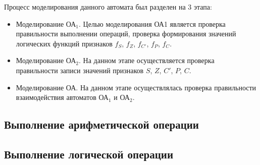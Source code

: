 Процесс моделирования данного автомата был разделен на 3 этапа:
\begin{itemize}
	\item Моделирование ОА$_1$. Целью моделирования ОА1 является проверка правильности выполнении операций, проверка формирования значений логических функций признаков $f_S$, $f_Z$, $f_{C'}$, $f_P$, $f_C$. 
	\item Моделирование ОА$_2$. На данном этапе осуществляется проверка правильности записи значений признаков $S$, $Z$, $C'$, $P$, $C$.
	\item Моделирование ОА. На данном этапе осуществлялась проверка правильности взаимодействия автоматов ОА$_1$ и ОА$_2$. 
\end{itemize}

\subsection{Выполнение арифметической операции}








\subsection{Выполнение логической операции}
